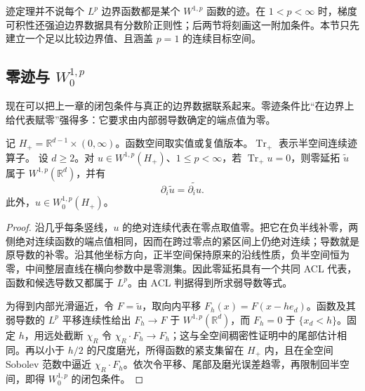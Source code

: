 迹定理并不说每个 \(L^p\) 边界函数都是某个 \(W^{1,p}\) 函数的迹。在 \(1<p<\infty\) 时，梯度可积性还强迫边界数据具有分数阶正则性；后两节将刻画这一附加条件。本节只先建立一个足以比较边界值、且涵盖 \(p=1\) 的连续目标空间。

\subsection{零迹与 \texorpdfstring{\(W_0^{1,p}\)}{W01,p}}
\label{b1:subsec:230104}

现在可以把上一章的闭包条件与真正的边界数据联系起来。零迹条件比“在边界上给代表赋零”强得多：它要求由内部弱导数确定的端点值为零。

\begin{lemma}\label{b1:lem:half-space-zero-trace-extension}
记 \(H_+=\mathbb R^{d-1}\times(0,\infty)\)。函数空间取实值或复值版本。\(\operatorname{Tr}_+\) 表示半空间连续迹算子。
设 \(d\ge2\)。对 \(u\in W^{1,p}(H_+)\)、\(1\le p<\infty\)，若 \(\operatorname{Tr}_+u=0\)，则零延拓 \(\widetilde u\) 属于 \(W^{1,p}(\mathbb R^d)\)，并有
\[
 \partial_i\widetilde u=\widetilde{\partial_i u}.
\]
此外，\(u\in W_0^{1,p}(H_+)\)。
\end{lemma}
\begin{proof}
沿几乎每条竖线，\(u\) 的绝对连续代表在零点取值零。把它在负半线补零，两侧绝对连续函数的端点值相同，因而在跨过零点的紧区间上仍绝对连续；导数就是原导数的补零。沿其他坐标方向，正半空间保持原来的沿线性质，负半空间恒为零，中间整层直线在横向参数中是零测集。因此零延拓具有一个共同 ACL 代表，函数和候选导数又都属于 \(L^p\)。由 ACL 判据得到所求弱导数等式。

为得到内部光滑逼近，令 \(F=\widetilde u\)，取向内平移 \(F_h(x)=F(x-he_d)\)。函数及其弱导数的 \(L^p\) 平移连续性给出 \(F_h\to F\) 于 \(W^{1,p}(\mathbb R^d)\)，而 \(F_h=0\) 于 \(\{x_d<h\}\)。固定 \(h\)，用远处截断 \(\chi_R\) 令 \(\chi_R\cdot F_h\to F_h\)；这与全空间稠密性证明中的尾部估计相同。再以小于 \(h/2\) 的尺度磨光，所得函数的紧支集留在 \(H_+\) 内，且在全空间 Sobolev 范数中逼近 \(\chi_R\cdot F_h\)。依次令平移、尾部及磨光误差趋零，再限制回半空间，即得 \(W_0^{1,p}\) 的闭包条件。
\end{proof}

